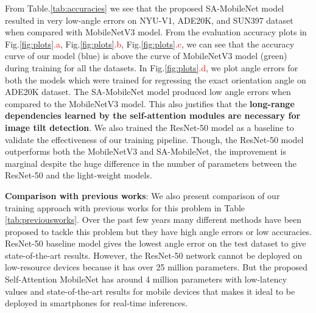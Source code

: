 \documentclass{bmvc2k}
\begin{document}
From Table.\ref{tab:accuracies} we see that the proposed SA-MobileNet model resulted in very low-angle errors on NYU-V1, ADE20K, and SUN397 dataset when compared with MobileNetV3 model. From the evaluation accuracy plots in Fig.\ref{fig:plots}\textcolor{red}{.a}, Fig.\ref{fig:plots}\textcolor{red}{.b}, Fig.\ref{fig:plots}\textcolor{red}{.c}, we can see that the accuracy curve of our model (blue) is above the curve of MobileNetV3 model (green) during training for all the datasets. In Fig.\ref{fig:plots}\textcolor{red}{.d}, we plot angle errors for both the models which were trained for regressing the exact orientation angle on ADE20K dataset. The SA-MobileNet model produced low angle errors when compared to the MobileNetV3 model. This also justifies that the \textbf{long-range dependencies learned by the self-attention modules are necessary for image tilt detection}. We also trained the ResNet-50 model as a baseline to validate the effectiveness of our training pipeline. Though, the ResNet-50 model outperforms both the MobileNetV3 and SA-MobileNet, the improvement is marginal despite the huge difference in the number of parameters between the ResNet-50 and the light-weight models. 

\textbf{Comparison with previous works}: We also present comparison of our training approach with previous works for this problem in Table \ref{tab:previousworks}. Over the past few years many different methods have been proposed to tackle this problem but they have high angle errors or low accuracies. ResNet-50 baseline model gives the lowest angle error on the test dataset to give state-of-the-art results. However, the ResNet-50 network cannot be deployed on low-resource devices because it has over 25 million parameters. But the proposed Self-Attention MobileNet has around 4 million parameters with low-latency values and state-of-the-art results for mobile devices that makes it ideal to be deployed in smartphones for real-time inferences. 
\end{document}
